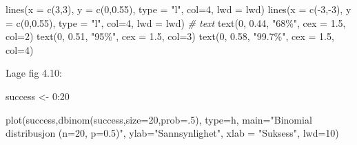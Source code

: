 \documentclass[
]{book}
\newenvironment{Shaded}{\begin{snugshade}}{\end{snugshade}}
\newcommand{\AttributeTok}[1]{\textcolor[rgb]{0.77,0.63,0.00}{#1}}
\newcommand{\CommentTok}[1]{\textcolor[rgb]{0.56,0.35,0.01}{\textit{#1}}}
\newcommand{\DecValTok}[1]{\textcolor[rgb]{0.00,0.00,0.81}{#1}}
\newcommand{\FloatTok}[1]{\textcolor[rgb]{0.00,0.00,0.81}{#1}}
\newcommand{\FunctionTok}[1]{\textcolor[rgb]{0.00,0.00,0.00}{#1}}
\newcommand{\NormalTok}[1]{#1}
\newcommand{\OtherTok}[1]{\textcolor[rgb]{0.56,0.35,0.01}{#1}}
\newcommand{\SpecialCharTok}[1]{\textcolor[rgb]{0.00,0.00,0.00}{#1}}
\newcommand{\StringTok}[1]{\textcolor[rgb]{0.31,0.60,0.02}{#1}}
\begin{document}
\begin{Shaded}
\begin{Highlighting}[]
\FunctionTok{lines}\NormalTok{(}\AttributeTok{x =} \FunctionTok{c}\NormalTok{(}\DecValTok{3}\NormalTok{,}\DecValTok{3}\NormalTok{), }\AttributeTok{y =} \FunctionTok{c}\NormalTok{(}\DecValTok{0}\NormalTok{,}\FloatTok{0.55}\NormalTok{), }\AttributeTok{type =} \StringTok{"l"}\NormalTok{, }\AttributeTok{col=}\DecValTok{4}\NormalTok{, }\AttributeTok{lwd =}\NormalTok{ lwd)}
\FunctionTok{lines}\NormalTok{(}\AttributeTok{x =} \FunctionTok{c}\NormalTok{(}\SpecialCharTok{{-}}\DecValTok{3}\NormalTok{,}\SpecialCharTok{{-}}\DecValTok{3}\NormalTok{), }\AttributeTok{y =} \FunctionTok{c}\NormalTok{(}\DecValTok{0}\NormalTok{,}\FloatTok{0.55}\NormalTok{), }\AttributeTok{type =} \StringTok{"l"}\NormalTok{, }\AttributeTok{col=}\DecValTok{4}\NormalTok{, }\AttributeTok{lwd =}\NormalTok{ lwd)}
\CommentTok{\# text}
\FunctionTok{text}\NormalTok{(}\DecValTok{0}\NormalTok{, }\FloatTok{0.44}\NormalTok{, }\StringTok{"68\%"}\NormalTok{, }\AttributeTok{cex =} \FloatTok{1.5}\NormalTok{, }\AttributeTok{col=}\DecValTok{2}\NormalTok{)}
\FunctionTok{text}\NormalTok{(}\DecValTok{0}\NormalTok{, }\FloatTok{0.51}\NormalTok{, }\StringTok{"95\%"}\NormalTok{, }\AttributeTok{cex =} \FloatTok{1.5}\NormalTok{, }\AttributeTok{col=}\DecValTok{3}\NormalTok{)}
\FunctionTok{text}\NormalTok{(}\DecValTok{0}\NormalTok{, }\FloatTok{0.58}\NormalTok{, }\StringTok{"99.7\%"}\NormalTok{, }\AttributeTok{cex =} \FloatTok{1.5}\NormalTok{, }\AttributeTok{col=}\DecValTok{4}\NormalTok{)}
\end{Highlighting}
\end{Shaded}

Lage fig 4.10:

\begin{Shaded}
\begin{Highlighting}[]
\NormalTok{success }\OtherTok{\textless{}{-}} \DecValTok{0}\SpecialCharTok{:}\DecValTok{20}

\FunctionTok{plot}\NormalTok{(success,}\FunctionTok{dbinom}\NormalTok{(success,}\AttributeTok{size=}\DecValTok{20}\NormalTok{,}\AttributeTok{prob=}\NormalTok{.}\DecValTok{5}\NormalTok{),}
     \AttributeTok{type=}\StringTok{\textquotesingle{}h\textquotesingle{}}\NormalTok{,}
     \AttributeTok{main=}\StringTok{"Binomial distribusjon (n=20, p=0.5)"}\NormalTok{,}
     \AttributeTok{ylab=}\StringTok{"Sannsynlighet"}\NormalTok{,}
     \AttributeTok{xlab =} \StringTok{"Suksess"}\NormalTok{,}
     \AttributeTok{lwd=}\DecValTok{10}\NormalTok{)}
\end{Highlighting}
\end{Shaded}
\end{document}

